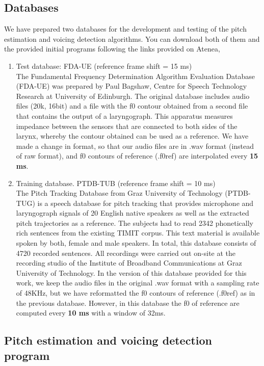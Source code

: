 \documentclass[a4paper,11pt]{article}
\begin{document}
\subsection*{Databases}
We have prepared two databases for the development and testing of the pitch estimation and voicing detection algorithms. You can download both of them and the provided initial programs following the links provided on Atenea,

\begin{enumerate}
\item Test database: FDA-UE (reference frame shift = 15 ms)\\
The Fundamental Frequency Determination Algorithm Evaluation Database (FDA-UE) was prepared by Paul Bagshaw, Centre for Speech Technology Research at University of Edinburgh. The original database includes audio files (20k, 16bit) and a file with the f0 contour obtained from a second file that contains the output of a laryngograph. This apparatus measures impedance between the sensors that are connected to both sides of the larynx, whereby the contour obtained can be used as a reference. We have made a change in format, so that our audio files are in .wav format (instead of raw format), and f0 contours of reference (.f0ref) are interpolated every \textbf{15 ms}.
\item Training database. PTDB-TUB (reference frame shift = 10 ms)\\
The Pitch Tracking Database from Graz University of Technology (PTDB-TUG) is a speech database for pitch tracking that provides microphone and laryngograph signals of 20 English native speakers as well as the extracted pitch trajectories as a reference. The subjects had to read 2342 phonetically rich sentences from the existing TIMIT corpus. This text material is available spoken by both, female and male speakers. In total, this database consists of 4720 recorded sentences. All recordings were carried out on-site at the recording studio of the Institute of Broadband Communications at Graz University of Technology. In the version of this database provided for this work, we keep the audio files in the original .wav format with a sampling rate of 48KHz, but we have reformatted the f0 contours of reference (.f0ref) as in the previous database. However, in this database the f0 of reference are computed every \textbf{10 ms} with a window of 32ms.
\end{enumerate}


\subsection*{Pitch estimation and voicing detection program}
\end{document}
